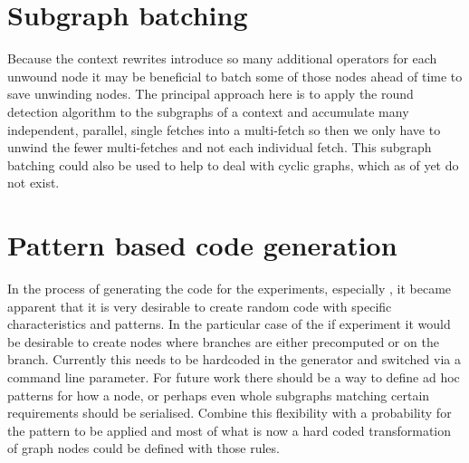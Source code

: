 \section{Subgraph batching}

Because the context rewrites introduce so many additional operators for each unwound node it may be beneficial to batch some of those nodes ahead of time to save unwinding nodes.
The principal approach here is to apply the round detection algorithm to the subgraphs of a context and accumulate many independent, parallel, single fetches into a multi-fetch so then we only have to unwind the fewer multi-fetches and not each individual fetch.
This subgraph batching could also be used to help \yauhau{} to deal with cyclic graphs, which as of yet do not exist.

\section{Pattern based code generation}

In the process of generating the code for the experiments, especially \ifop{}, it became apparent that it is very desirable to create random code with specific characteristics and patterns.
In the particular case of the if experiment it would be desirable to create nodes where branches are either precomputed or on the branch.
Currently this needs to be hardcoded in the generator and switched via a command line parameter.
For future work there should be a way to define ad hoc patterns for how a node, or perhaps even whole subgraphs matching certain requirements should be serialised.
Combine this flexibility with a probability for the pattern to be applied and most of what is now a hard coded transformation of graph nodes could be defined with those rules.
